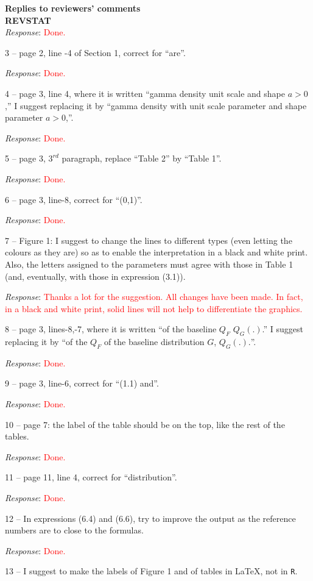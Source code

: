 \documentclass[version=last,12pt,{"maintainersDelight"}]{scrlttr2}
\begin{document}
\begin{letter}{\textbf{Replies to reviewers' comments}\\\textbf{REVSTAT}\\}
\emph{Response}: \textcolor{red}{Done.}

3 -- page 2, line -4 of Section 1, correct for ``are''.

\emph{Response}: \textcolor{red}{Done.}

4 -- page 3, line 4, where it is written ``gamma density unit scale and shape \(a>0\),'' I suggest replacing it by ``gamma density with unit scale parameter and shape parameter \(a>0\),''.

\emph{Response}: \textcolor{red}{Done.}

5 -- page 3, \(3^{rd}\) paragraph, replace ``Table 2'' by ``Table 1''.

\emph{Response}: \textcolor{red}{Done.}

6 -- page 3, line-8, correct for ``(0,1)''.

\emph{Response}: \textcolor{red}{Done.}

7 -- Figure 1: I suggest to change the lines to different types (even letting the colours as they are) so as to enable the interpretation 
in a black and white print. Also, the letters assigned to the parameters must agree with those in Table 1 (and, eventually, with those in expression (3.1)).

\emph{Response}:
\textcolor{red}{Thanks a lot for the suggestion. All changes have been made. In fact, in a black and white print, solid lines will not help to differentiate the graphics.}

8 -- page 3, lines-8,-7, where it is written ``of the baseline \(Q_F\) \(Q_G(.)\).'' I suggest replacing it by ``of the \(Q_F\) of the baseline distribution \(G\), \(Q_G(.).\)''.

\emph{Response}: \textcolor{red}{Done.}

9 -- page 3, line-6, correct for ``(1.1) and''.

\emph{Response}: \textcolor{red}{Done.}

10 -- page 7: the label of the table should be on the top, like the rest of the tables.

\emph{Response}: \textcolor{red}{Done.}

11 -- page 11, line 4, correct for ``distribution''.

\emph{Response}: \textcolor{red}{Done.}

12 -- In expressions (6.4) and (6.6), try to improve the output as the reference numbers are to close to the formulas.

\emph{Response}: \textcolor{red}{Done.}

13 -- I suggest to make the labels of Figure 1 and of tables in \LaTeX, not in \texttt{R}.


\end{letter}
\end{document}

